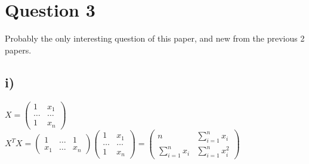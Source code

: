 \documentclass{article}
\begin{document}
\section*{Question 3}
Probably the only interesting question of this paper, and new from the previous 2 papers. 
\subsection*{i)}
$X = \begin{pmatrix}
    1 & x_1 \\ 
    \dots & \dots \\ 
    1 & x_n
\end{pmatrix}$ \\
$
X^TX = \begin{pmatrix}
    1 & \dots & 1 \\ 
    x_1 & \dots & x_n
\end{pmatrix} \begin{pmatrix}
    1 & x_1 \\ 
    \dots & \dots \\ 
    1 & x_n
\end{pmatrix} = \begin{pmatrix}
    n & \sum_{i=1}^n x_i \\ 
    \sum_{i=1}^n x_i & \sum_{i=1}^n x_i^2
\end{pmatrix}
$
\end{document}
